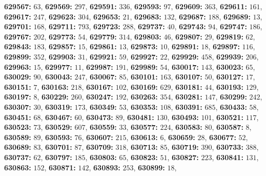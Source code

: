 \textsf{\bfseries 629567:} $63$, \textsf{\bfseries 629569:} $297$, \textsf{\bfseries 629591:} $336$, \textsf{\bfseries 629593:} $97$, \textsf{\bfseries 629609:} $363$, \textsf{\bfseries 629611:} $161$, \textsf{\bfseries 629617:} $247$, \textsf{\bfseries 629623:} $304$, \textsf{\bfseries 629653:} $21$, \textsf{\bfseries 629683:} $132$, \textsf{\bfseries 629687:} $188$, \textsf{\bfseries 629689:} $13$, \textsf{\bfseries 629701:} $168$, \textsf{\bfseries 629711:} $793$, \textsf{\bfseries 629723:} $288$, \textsf{\bfseries 629737:} $40$, \textsf{\bfseries 629743:} $94$, \textsf{\bfseries 629747:} $186$, \textsf{\bfseries 629767:} $202$, \textsf{\bfseries 629773:} $54$, \textsf{\bfseries 629779:} $314$, \textsf{\bfseries 629803:} $46$, \textsf{\bfseries 629807:} $29$, \textsf{\bfseries 629819:} $62$, \textsf{\bfseries 629843:} $183$, \textsf{\bfseries 629857:} $15$, \textsf{\bfseries 629861:} $13$, \textsf{\bfseries 629873:} $10$, \textsf{\bfseries 629891:} $18$, \textsf{\bfseries 629897:} $116$, \textsf{\bfseries 629899:} $352$, \textsf{\bfseries 629903:} $31$, \textsf{\bfseries 629921:} $59$, \textsf{\bfseries 629927:} $22$, \textsf{\bfseries 629929:} $458$, \textsf{\bfseries 629939:} $206$, \textsf{\bfseries 629963:} $15$, \textsf{\bfseries 629977:} $11$, \textsf{\bfseries 629987:} $191$, \textsf{\bfseries 629989:} $54$, \textsf{\bfseries 630017:} $143$, \textsf{\bfseries 630023:} $65$, \textsf{\bfseries 630029:} $90$, \textsf{\bfseries 630043:} $247$, \textsf{\bfseries 630067:} $85$, \textsf{\bfseries 630101:} $163$, \textsf{\bfseries 630107:} $50$, \textsf{\bfseries 630127:} $17$, \textsf{\bfseries 630151:} $7$, \textsf{\bfseries 630163:} $218$, \textsf{\bfseries 630167:} $102$, \textsf{\bfseries 630169:} $629$, \textsf{\bfseries 630181:} $44$, \textsf{\bfseries 630193:} $129$, \textsf{\bfseries 630197:} $8$, \textsf{\bfseries 630229:} $260$, \textsf{\bfseries 630247:} $192$, \textsf{\bfseries 630263:} $354$, \textsf{\bfseries 630281:} $147$, \textsf{\bfseries 630299:} $242$, \textsf{\bfseries 630307:} $30$, \textsf{\bfseries 630319:} $173$, \textsf{\bfseries 630349:} $53$, \textsf{\bfseries 630353:} $108$, \textsf{\bfseries 630391:} $685$, \textsf{\bfseries 630433:} $58$, \textsf{\bfseries 630451:} $68$, \textsf{\bfseries 630467:} $60$, \textsf{\bfseries 630473:} $89$, \textsf{\bfseries 630481:} $130$, \textsf{\bfseries 630493:} $101$, \textsf{\bfseries 630521:} $117$, \textsf{\bfseries 630523:} $73$, \textsf{\bfseries 630529:} $607$, \textsf{\bfseries 630559:} $33$, \textsf{\bfseries 630577:} $224$, \textsf{\bfseries 630583:} $80$, \textsf{\bfseries 630587:} $8$, \textsf{\bfseries 630589:} $89$, \textsf{\bfseries 630593:} $76$, \textsf{\bfseries 630607:} $215$, \textsf{\bfseries 630613:} $6$, \textsf{\bfseries 630659:} $28$, \textsf{\bfseries 630677:} $52$, \textsf{\bfseries 630689:} $83$, \textsf{\bfseries 630701:} $87$, \textsf{\bfseries 630709:} $318$, \textsf{\bfseries 630713:} $85$, \textsf{\bfseries 630719:} $390$, \textsf{\bfseries 630733:} $388$, \textsf{\bfseries 630737:} $62$, \textsf{\bfseries 630797:} $185$, \textsf{\bfseries 630803:} $65$, \textsf{\bfseries 630823:} $51$, \textsf{\bfseries 630827:} $223$, \textsf{\bfseries 630841:} $131$, \textsf{\bfseries 630863:} $152$, \textsf{\bfseries 630871:} $142$, \textsf{\bfseries 630893:} $253$, \textsf{\bfseries 630899:} $18$, 
